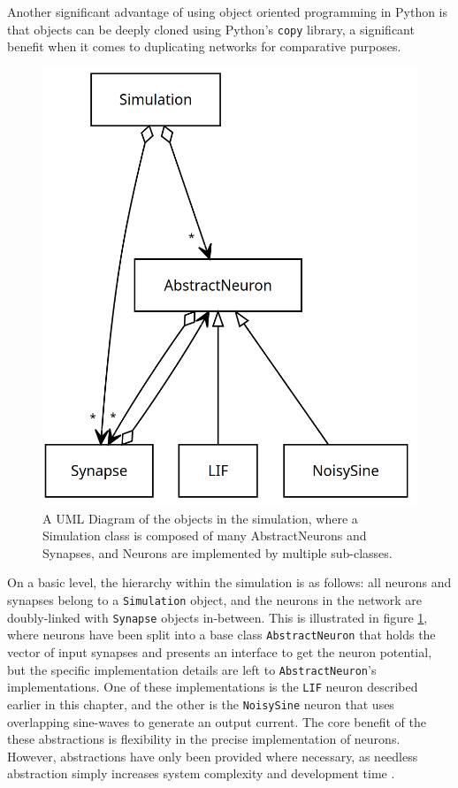 Another significant advantage of using object oriented programming in Python is
that objects can be deeply cloned using Python's \texttt{copy} library, a
significant benefit when it comes to duplicating networks for comparative
purposes.

\begin{figure}[h!]
    \centering
    \includegraphics[width=0.5\linewidth]{figures/images/UML2.png}
    \caption[UML Diagram of objects in the simulation]{A UML Diagram of the
    objects in the simulation, where a Simulation class is composed of many
    AbstractNeurons and Synapses, and Neurons are implemented by multiple
    sub-classes.}
    \label{fig:uml}
\end{figure}

On a basic level, the hierarchy within the simulation is as follows: all neurons
and synapses belong to a \texttt{Simulation} object, and the neurons in the
network are doubly-linked with \texttt{Synapse} objects in-between. This is
illustrated in figure
\ref{fig:uml}, where neurons have been split into a base class \texttt{AbstractNeuron}
that holds the vector of input synapses and presents an interface to get the
neuron potential, but the specific implementation details are left to
\texttt{AbstractNeuron}'s implementations. One of these implementations is the
\texttt{LIF} neuron described earlier in this chapter, and the other is
the \texttt{NoisySine} neuron that uses overlapping sine-waves to generate an
output current. The core benefit of the these abstractions is
flexibility in the precise implementation of neurons. However, abstractions have
only been provided where necessary, as needless abstraction simply increases
system complexity and development time \autocite{shaw_abstraction_1984}.

